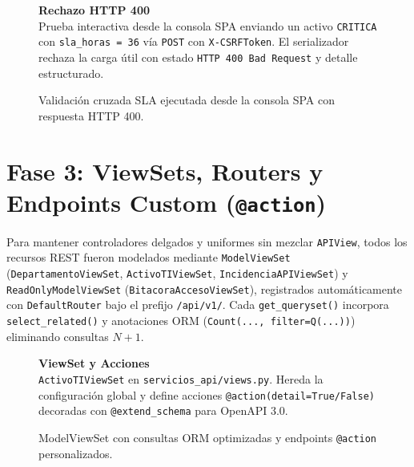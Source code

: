 \documentclass[10pt,a4paper]{article}
\begin{document}
\begin{figure}[H]
\centering
\begin{minipage}[c]{0.73\textwidth}
    \centering
\end{minipage}\hfill
\begin{minipage}[c]{0.24\textwidth}
    \raggedright
    \textbf{\color{uncpnavy}\small Rechazo HTTP 400}\\[4pt]
    \footnotesize
    \color{uncpdark}
    Prueba interactiva desde la consola SPA enviando un activo \texttt{CRITICA} con \texttt{sla\_horas = 36} vía \texttt{POST} con \texttt{X-CSRFToken}. El serializador rechaza la carga útil con estado \texttt{HTTP 400 Bad Request} y detalle estructurado.
\end{minipage}
\vspace{-0.2cm}
\caption{Validación cruzada SLA ejecutada desde la consola SPA con respuesta HTTP 400.}
\label{fig:interfaz_400}
\end{figure}

\newpage

\section{Fase 3: ViewSets, Routers y Endpoints Custom (\texttt{@action})}
Para mantener controladores delgados y uniformes sin mezclar \texttt{APIView}, todos los recursos REST fueron modelados mediante \texttt{ModelViewSet} (\texttt{DepartamentoViewSet}, \texttt{ActivoTIViewSet}, \texttt{IncidenciaAPIViewSet}) y \texttt{ReadOnlyModelViewSet} (\texttt{BitacoraAccesoViewSet}), registrados automáticamente con \texttt{DefaultRouter} bajo el prefijo \texttt{/api/v1/}. Cada \texttt{get\_queryset()} incorpora \texttt{select\_related()} y anotaciones ORM (\texttt{Count(..., filter=Q(...))}) eliminando consultas $N+1$.

\begin{figure}[H]
\centering
\begin{minipage}[c]{0.73\textwidth}
    \centering
\end{minipage}\hfill
\begin{minipage}[c]{0.24\textwidth}
    \raggedright
    \textbf{\color{uncpnavy}\small ViewSet y Acciones}\\[4pt]
    \footnotesize
    \color{uncpdark}
    \texttt{ActivoTIViewSet} en \texttt{servicios\_api/views.py}. Hereda la configuración global y define acciones \texttt{@action(detail=True/False)} decoradas con \texttt{@extend\_schema} para OpenAPI 3.0.
\end{minipage}
\vspace{-0.2cm}
\caption{ModelViewSet con consultas ORM optimizadas y endpoints \texttt{@action} personalizados.}
\label{fig:codesnap_viewsets}
\end{figure}
\end{document}
